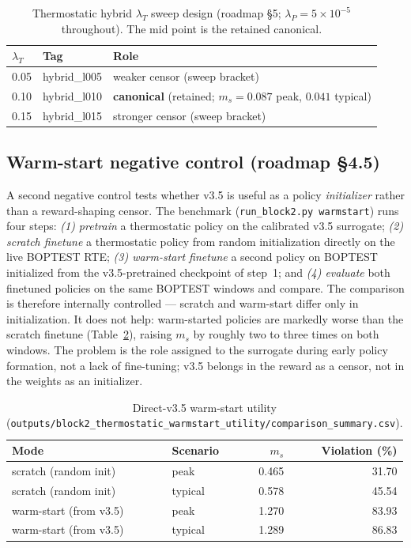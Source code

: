\documentclass[11pt,a4paper]{article}
\begin{document}
\begin{table}[H]
\centering
\caption{Thermostatic hybrid $\lambda_T$ sweep design (roadmap \S5; $\lambda_P=5\times10^{-5}$ throughout). The mid point is the retained canonical.}
\label{tab:hybrid_sweep}
\small
\begin{tabular}{lll}
\toprule
$\lambda_T$ & Tag & Role \\
\midrule
0.05 & hybrid\_l005 & weaker censor (sweep bracket) \\
0.10 & hybrid\_l010 & \textbf{canonical} (retained; $m_s=0.087$ peak, $0.041$ typical) \\
0.15 & hybrid\_l015 & stronger censor (sweep bracket) \\
\bottomrule
\end{tabular}
\end{table}

\subsection{Warm-start negative control (roadmap \S4.5)}

A second negative control tests whether v3.5 is useful as a policy \emph{initializer} rather than a reward-shaping censor. The benchmark (\texttt{run\_block2.py warmstart}) runs four steps: \emph{(1) pretrain} a thermostatic policy on the calibrated v3.5 surrogate; \emph{(2) scratch finetune} a thermostatic policy from random initialization directly on the live BOPTEST RTE; \emph{(3) warm-start finetune} a second policy on BOPTEST initialized from the v3.5-pretrained checkpoint of step~1; and \emph{(4) evaluate} both finetuned policies on the same BOPTEST windows and compare. The comparison is therefore internally controlled --- scratch and warm-start differ only in initialization. It does not help: warm-started policies are markedly worse than the scratch finetune (Table~\ref{tab:warmstart}), raising $m_s$ by roughly two to three times on both windows. The problem is the role assigned to the surrogate during early policy formation, not a lack of fine-tuning; v3.5 belongs in the reward as a censor, not in the weights as an initializer.

\begin{table}[H]
\centering
\caption{Direct-v3.5 warm-start utility (\texttt{outputs/block2\_thermostatic\_warmstart\_utility/comparison\_summary.csv}).}
\label{tab:warmstart}
\small
\begin{tabular}{llrr}
\toprule
Mode & Scenario & $m_s$ & Violation (\%) \\
\midrule
scratch (random init) & peak & 0.465 & 31.70 \\
scratch (random init) & typical & 0.578 & 45.54 \\
warm-start (from v3.5) & peak & 1.270 & 83.93 \\
warm-start (from v3.5) & typical & 1.289 & 86.83 \\
\bottomrule
\end{tabular}
\end{table}
\end{document}
